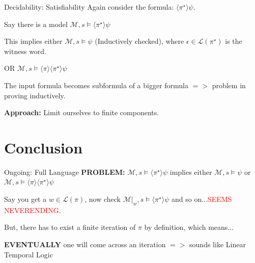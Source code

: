 \documentclass[usenames,dvipsnames]{beamer}
\newcommand\ldiaarg[1]{\langle#1\rangle}
\newcommand{\M}{\mathcal{M}}
\newcommand{\LL}{\mathcal{L}} %
\newcommand{\POL}{\mathsf{POL}}
\newcommand{\PSPACE}{\mathsf{PSPACE}}
\begin{document}
    \begin{frame}{Decidability: Satisfiability}
        Again consider the formula: $\ldiaarg{\pi^\star}\psi$.\pause

        Say there is a model $\M,s\vDash\ldiaarg{\pi^\star}\psi$\pause

        This implies either $\M,s\vDash\psi$ (Inductively checked), where $\epsilon\in\LL(\pi^\star)$ is the witness word.\pause

        OR $\M,s\vDash\ldiaarg{\pi}\ldiaarg{\pi^\star}\psi$\pause

        The input formula becomes subformula of a  bigger formula $=>$ problem in proving inductively.\pause

        \textbf{Approach:} Limit ourselves to finite components.
    \end{frame}




\section{Conclusion}
\begin{frame}{Ongoing: Full Language}
    \textbf{PROBLEM:} $\M,s\vDash\ldiaarg{\pi^\star}\psi$ implies either $\M,s\vDash\psi$ or $\M,s\vDash\ldiaarg{\pi}\ldiaarg{\pi^\star}\psi$\pause

    Say you get a $w\in\LL(\pi)$, now check $\M|_w,s\vDash\ldiaarg{\pi^\star}\psi$ and so on...\pause \textcolor{red}{SEEMS NEVERENDING}.\pause

    But, there has to exist a finite iteration of $\pi$ by definition, which means...\pause

    \textbf{EVENTUALLY} one will come across an iteration \pause$=>$ sounds like Linear Temporal Logic\footnotemark[1]

\end{frame}
\end{document}
